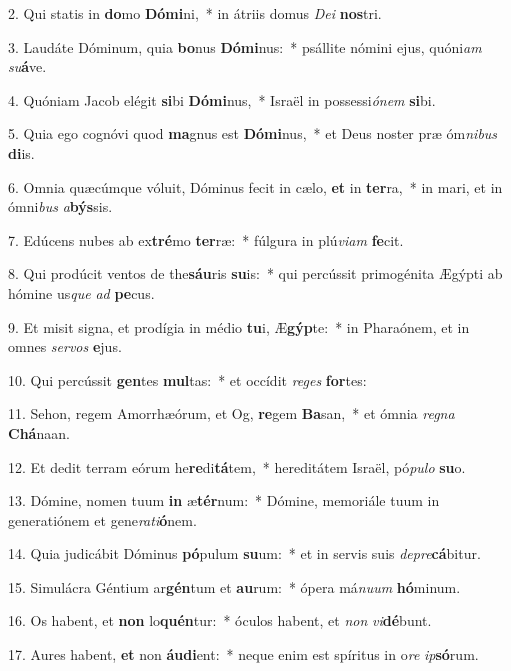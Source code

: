 2. Qui statis in \textbf{do}mo \textbf{Dó}\textbf{mi}ni,~*  in átriis domus \textit{De}\textit{i} \textbf{nos}tri.\

3. Laudáte Dóminum, quia \textbf{bo}nus \textbf{Dó}\textbf{mi}nus:~*  psállite nómini ejus, quóni\textit{am} \textit{su}\textbf{á}ve.\

4. Quóniam Jacob elégit \textbf{si}bi \textbf{Dó}\textbf{mi}nus,~*  Israël in possessi\textit{ó}\textit{nem} \textbf{si}bi.\

5. Quia ego cognóvi quod \textbf{ma}gnus est \textbf{Dó}\textbf{mi}nus,~*  et Deus noster præ óm\textit{ni}\textit{bus} \textbf{di}is.\

6. Omnia quæcúmque vóluit, Dóminus fecit in cælo, \textbf{et} in \textbf{ter}ra,~*  in mari, et in ómni\textit{bus} \textit{a}\textbf{býs}sis.\

7. Edúcens nubes ab ex\textbf{tré}mo \textbf{ter}ræ:~*  fúlgura in plú\textit{vi}\textit{am} \textbf{fe}cit.\

8. Qui prodúcit ventos de the\textbf{sáu}ris \textbf{su}is:~*  qui percússit primogénita Ægýpti ab hómine us\textit{que} \textit{ad} \textbf{pe}cus.\

9. Et misit signa, et prodígia in médio \textbf{tu}i, Æ\textbf{gýp}te:~*  in Pharaónem, et in omnes \textit{ser}\textit{vos} \textbf{e}jus.\

10. Qui percússit \textbf{gen}tes \textbf{mul}tas:~*  et occídit \textit{re}\textit{ges} \textbf{for}tes:\

11. Sehon, regem Amorrhæórum, et Og, \textbf{re}gem \textbf{Ba}san,~*  et ómnia \textit{re}\textit{gna} \textbf{Chá}naan.\

12. Et dedit terram eórum he\textbf{re}di\textbf{tá}tem,~*  hereditátem Israël, pó\textit{pu}\textit{lo} \textbf{su}o.\

13. Dómine, nomen tuum \textbf{in} æ\textbf{tér}num:~*  Dómine, memoriále tuum in generatiónem et gene\textit{ra}\textit{ti}\textbf{ó}nem.\

14. Quia judicábit Dóminus \textbf{pó}pulum \textbf{su}um:~*  et in servis suis \textit{de}\textit{pre}\textbf{cá}bitur.\

15. Simulácra Géntium ar\textbf{gén}tum et \textbf{au}rum:~*  ópera má\textit{nu}\textit{um} \textbf{hó}minum.\

16. Os habent, et \textbf{non} lo\textbf{quén}tur:~*  óculos habent, et \textit{non} \textit{vi}\textbf{dé}bunt.\

17. Aures habent, \textbf{et} non \textbf{áu}\textbf{di}ent:~*  neque enim est spíritus in o\textit{re} \textit{ip}\textbf{só}rum.\


